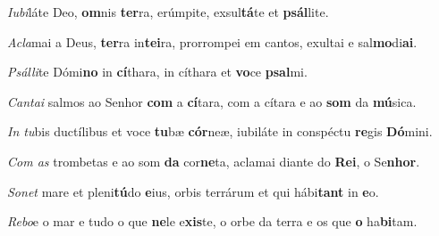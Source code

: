 \begin{greenumerate}
  \setcounter{enumi}{1}


  \item \textit{Iubi}láte Deo, \textbf{om}nis \textbf{ter}ra, {\GreStar} erúmpite, exsul\textbf{tá}te et \textbf{psál}lite. 

  \switchcolumn\setcounter{enumi}{1}

  \item \textit{Acla}mai a Deus, \textbf{ter}ra in\textbf{tei}ra, {\GreStar} prorrompei em cantos, exultai e sal\textbf{mo}di\textbf{ai}. 

  \switchcolumn*


  \item \textit{Psálli}te Dómi\textbf{no} in \textbf{cí}thara, {\GreStar} in cíthara et \textbf{vo}ce \textbf{psal}\-mi. 

  \switchcolumn%

  \item \textit{Cantai} salmos ao Senhor \textbf{com} a \textbf{cí}tara, {\GreStar} com a cítara e ao \textbf{som} da \textbf{mú}sica. 

  \switchcolumn*


  \item \textit{In tu}bis ductílibus et voce \textbf{tu}bæ \textbf{cór}neæ, {\GreStar} iubiláte in conspéctu \textbf{re}gis \textbf{Dó}mini. 

  \switchcolumn%

  \item \textit{Com as} trombetas e ao som \textbf{da} cor\textbf{ne}ta, {\GreStar} aclamai diante do \textbf{Rei}, o Se\textbf{nhor}. 

  \switchcolumn*


  \item \textit{Sonet} mare et pleni\textbf{tú}do \textbf{e}ius, {\GreStar} orbis terrárum et qui hábi\textbf{tant} in \textbf{e}o. 

  \switchcolumn%

  \item \textit{Rebo}e o mar e tudo o que \textbf{ne}le e\textbf{xis}te, {\GreStar} o orbe da terra e os que \textbf{o} ha\textbf{bi}tam. 


\end{greenumerate}
